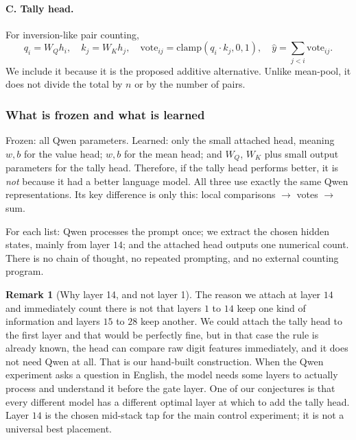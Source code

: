 \documentclass[10pt]{article}
\theoremstyle{definition}
\newtheorem{remark}{Remark}
\newcommand{\clampf}{\mathrm{clamp}}
\begin{document}
\paragraph{C. Tally head.}
For inversion-like pair counting,
\begin{equation}
q_i = W_Q h_i, \quad k_j = W_K h_j, \quad
\text{vote}_{ij} = \clampf(q_i \cdot k_j, 0, 1), \quad
\hat{y} = \sum_{j<i} \text{vote}_{ij}.
\label{eq:qwen-tally}
\end{equation}
We include it because it is the proposed additive alternative. Unlike
mean-pool, it does not divide the total by $n$ or by the number of pairs.



\subsubsection*{What is frozen and what is learned}

Frozen: all Qwen parameters. Learned: only the small attached head, meaning
$w, b$ for the value head; $w, b$ for the mean head; and $W_Q$, $W_K$ plus
small output parameters for the tally head. Therefore, if the tally head
performs better, it is \emph{not} because it had a better language model.
All three use exactly the same Qwen representations. Its key difference is
only this: local comparisons $\rightarrow$ votes $\rightarrow$ sum.

For each list: Qwen processes the prompt once; we extract the chosen
hidden states, mainly from layer $14$; and the attached head outputs one
numerical count. There is no chain of thought, no repeated prompting, and
no external counting program.

\begin{remark}[Why layer 14, and not layer 1]
\label{rem:layer14}
The reason we attach at layer $14$ and immediately count there is not that
layers $1$ to $14$ keep one kind of information and layers $15$ to $28$ keep
another. We could attach the tally head to the first layer and that would
be perfectly fine, but in that case the rule is already known, the head
can compare raw digit features immediately, and it does not need Qwen at
all. That is our hand-built construction. When the Qwen experiment asks a
question in English, the model needs some layers to actually process and
understand it before the gate layer. One of our conjectures is that every
different model has a different optimal layer at which to add the tally
head. Layer $14$ is the chosen mid-stack tap for the main control
experiment; it is not a universal best placement.
\end{remark}
\end{document}
